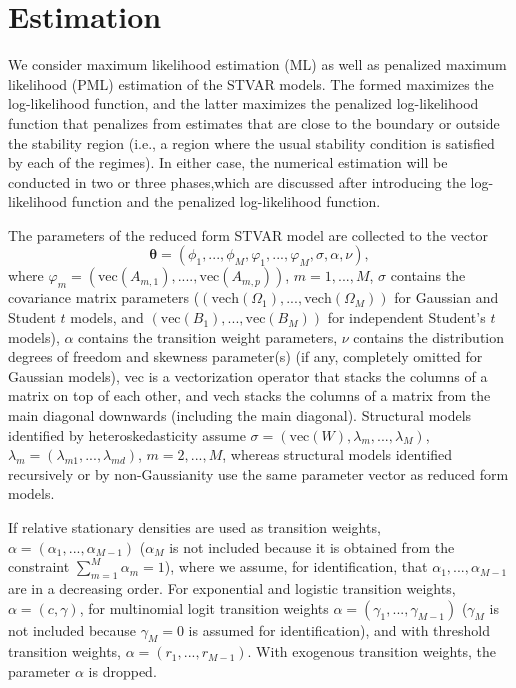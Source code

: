 \documentclass[nojss]{jss}
\begin{document}
\section{Estimation}\label{sec:estimation}
We consider maximum likelihood estimation (ML) as well as penalized maximum likelihood (PML) estimation of the STVAR models. The formed maximizes the log-likelihood function, and the latter maximizes the penalized log-likelihood function that penalizes from estimates that are close to the boundary or outside the stability region (i.e., a region where the usual stability condition is satisfied by each of the regimes). In either case, the numerical estimation will be conducted in two or three phases,which are discussed after introducing the log-likelihood function and the penalized log-likelihood function.

The parameters of the reduced form STVAR model are collected to the vector
\begin{equation}\label{eq:paramvector}
\boldsymbol{\theta}=(\phi_{1},...,\phi_M,\varphi_1,...,\varphi_M,\sigma,\alpha,\nu),
\end{equation}
where $\varphi_m=(\text{vec}(A_{m,1}),....,\text{vec}(A_{m,p}))$, $m=1,...,M$, $\sigma$ contains the covariance matrix parameters ($(\text{vech}(\Omega_1),...,\text{vech}(\Omega_M))$ for Gaussian and Student $t$ models, and $(\text{vec}(B_1),...,\text{vec}(B_M))$ for independent Student's $t$ models), $\alpha$ contains the transition weight parameters, $\nu$ contains the distribution degrees of freedom and skewness parameter(s) (if any, completely omitted for Gaussian models), vec is a vectorization operator that stacks the columns of a matrix on top of each other, and vech stacks the columns of a matrix from the main diagonal downwards (including the main diagonal). Structural models identified by heteroskedasticity assume $\sigma = (\text{vec}(W),\lambda_m,...,\lambda_M)$, $\lambda_m=(\lambda_{m1},...,\lambda_{md})$, $m=2,...,M$, whereas structural models identified recursively or by non-Gaussianity use the same parameter vector as reduced form models.

If relative stationary densities are used as transition weights, $\alpha=(\alpha_1,...,\alpha_{M-1})$ ($\alpha_M$ is not included because it is obtained from the constraint $\sum_{m=1}^M \alpha_m=1$), where we assume, for identification, that $\alpha_1,...,\alpha_{M-1}$ are in a decreasing order. For exponential and logistic transition weights, $\alpha=(c,\gamma)$, for multinomial logit transition weights  $\alpha=(\gamma_1,...,\gamma_{M-1})$ ($\gamma_M$ is not included because $\gamma_M=0$ is assumed for identification), and with threshold transition weights, $\alpha=(r_1,...,r_{M-1})$. With exogenous transition weights, the parameter $\alpha$ is dropped.
\end{document}
